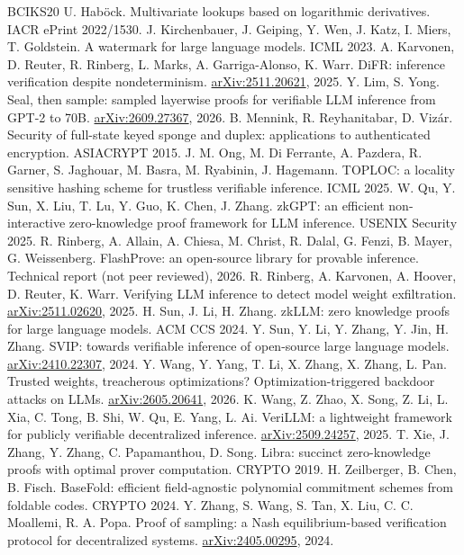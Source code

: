 \documentclass[10pt]{article}
\begin{document}
\begin{thebibliography}{BCIKS20}
 U. Hab\"ock. Multivariate lookups based on logarithmic derivatives. IACR ePrint 2022/1530.
 J. Kirchenbauer, J. Geiping, Y. Wen, J. Katz, I. Miers, T. Goldstein. A watermark for large language models. ICML 2023.
 A. Karvonen, D. Reuter, R. Rinberg, L. Marks, A. Garriga-Alonso, K. Warr. DiFR: inference verification despite nondeterminism. \href{https://arxiv.org/abs/2511.20621}{arXiv:2511.20621}, 2025.
 Y. Lim, S. Yong. Seal, then sample: sampled layerwise proofs for verifiable LLM inference from GPT-2 to 70B. \href{https://arxiv.org/abs/2609.27367}{arXiv:2609.27367}, 2026.
 B. Mennink, R. Reyhanitabar, D. Viz\'ar. Security of full-state keyed sponge and duplex: applications to authenticated encryption. ASIACRYPT 2015.
 J. M. Ong, M. Di Ferrante, A. Pazdera, R. Garner, S. Jaghouar, M. Basra, M. Ryabinin, J. Hagemann. TOPLOC: a locality sensitive hashing scheme for trustless verifiable inference. ICML 2025.
 W. Qu, Y. Sun, X. Liu, T. Lu, Y. Guo, K. Chen, J. Zhang. zkGPT: an efficient non-interactive zero-knowledge proof framework for LLM inference. USENIX Security 2025.
 R. Rinberg, A. Allain, A. Chiesa, M. Christ, R. Dalal, G. Fenzi, B. Mayer, G. Weissenberg. FlashProve: an open-source library for provable inference. Technical report (not peer reviewed), 2026.
 R. Rinberg, A. Karvonen, A. Hoover, D. Reuter, K. Warr. Verifying LLM inference to detect model weight exfiltration. \href{https://arxiv.org/abs/2511.02620}{arXiv:2511.02620}, 2025.
 H. Sun, J. Li, H. Zhang. zkLLM: zero knowledge proofs for large language models. ACM CCS 2024.
 Y. Sun, Y. Li, Y. Zhang, Y. Jin, H. Zhang. SVIP: towards verifiable inference of open-source large language models. \href{https://arxiv.org/abs/2410.22307}{arXiv:2410.22307}, 2024.
 Y. Wang, Y. Yang, T. Li, X. Zhang, X. Zhang, L. Pan. Trusted weights, treacherous optimizations? Optimization-triggered backdoor attacks on LLMs. \href{https://arxiv.org/abs/2605.20641}{arXiv:2605.20641}, 2026.
 K. Wang, Z. Zhao, X. Song, Z. Li, L. Xia, C. Tong, B. Shi, W. Qu, E. Yang, L. Ai. VeriLLM: a lightweight framework for publicly verifiable decentralized inference. \href{https://arxiv.org/abs/2509.24257}{arXiv:2509.24257}, 2025.
 T. Xie, J. Zhang, Y. Zhang, C. Papamanthou, D. Song. Libra: succinct zero-knowledge proofs with optimal prover computation. CRYPTO 2019.
 H. Zeilberger, B. Chen, B. Fisch. BaseFold: efficient field-agnostic polynomial commitment schemes from foldable codes. CRYPTO 2024.
 Y. Zhang, S. Wang, S. Tan, X. Liu, C. C. Moallemi, R. A. Popa. Proof of sampling: a Nash equilibrium-based verification protocol for decentralized systems. \href{https://arxiv.org/abs/2405.00295}{arXiv:2405.00295}, 2024.
\end{thebibliography}
\end{document}
